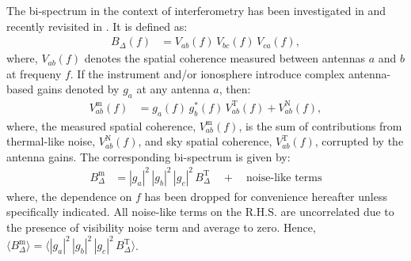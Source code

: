 \documentclass[
reprint,
superscriptaddress,
amsmath,
amssymb,
aps,
prd
]{revtex4-1}
\begin{document}
The bi-spectrum in the context of interferometry has been investigated in \cite{jen58,kul89,tay99,tho01} and recently revisited in \cite{car18}. It is defined as:
\begin{align}
  B_\Delta(f) &= V_{ab}(f)\,V_{bc}(f)\,V_{ca}(f),
\end{align}
where, $V_{ab}(f)$ denotes the spatial coherence measured between antennas $a$ and $b$ at frequeny $f$. If the instrument and/or ionosphere introduce complex antenna-based gains denoted by $g_a$ at any antenna $a$, then: 
\begin{align}\label{eqn:vis-antgains}
  V_{ab}^\textrm{m}(f) &= g_a(f)\, g_b^*(f)\, V_{ab}^\textrm{T}(f) + V_{ab}^\textrm{N}(f),
\end{align}
where, the measured spatial coherence, $V_{ab}^\textrm{m}(f)$, is the sum of contributions from thermal-like noise, $V_{ab}^\textrm{N}(f)$, and sky spatial coherence, $V_{ab}^\textrm{T}(f)$, corrupted by the antenna gains. The corresponding bi-spectrum is given by:
\begin{align}\label{eqn:bispectrum-terms}
  B_\Delta^\textrm{m} &= |g_a|^2\, |g_b|^2\, |g_c|^2\, B_\Delta^\textrm{T}\quad + \quad \textrm{noise-like terms}
\end{align}
where, the dependence on $f$ has been dropped for convenience hereafter unless specifically indicated.
All noise-like terms on the R.H.S. are uncorrelated due to the presence of visibility noise term and average to zero.
Hence, $\langle B_\Delta^\textrm{m}\rangle = \langle |g_a|^2\, |g_b|^2\, |g_c|^2\, B_\Delta^\textrm{T}\rangle$.
\end{document}
